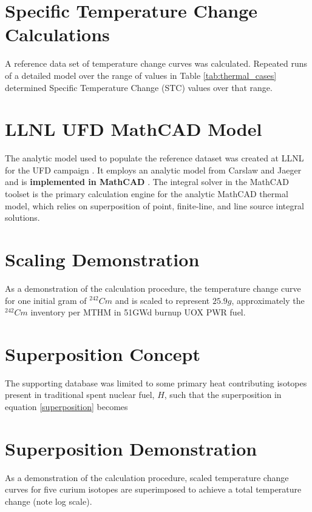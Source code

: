 \documentclass[letterpaper]{article}
\begin{document}
\section{Specific Temperature Change Calculations}
\footnotesize{A reference data set of temperature change curves was calculated. 
Repeated runs of a detailed model over the range of values in Table 
\ref{tab:thermal_cases} determined Specific Temperature Change (STC) values 
over that range.

\section{LLNL UFD MathCAD Model}
The analytic model used to populate the reference dataset was created at 
LLNL for the UFD campaign \cite{hardin_generic_2011, 
greenberg_investigations_2012, greenberg_application_2012}. It employs an 
analytic model from Carslaw and Jaeger and is \textbf{implemented in MathCAD}
\cite{carslaw_conduction_1959, ptc_mathcad_2010}.  The integral solver in the 
MathCAD toolset is the primary calculation engine for the analytic MathCAD 
thermal model, which relies on superposition of point, finite-line, and line 
source integral solutions.  


\section{Scaling Demonstration}
As a demonstration of the calculation procedure, the temperature change 
  curve for one initial gram of $^{242}Cm$ and is scaled to represent $25.9g$, 
  approximately the $^{242}Cm$ inventory per MTHM in 51GWd burnup UOX PWR fuel.

\section{Superposition Concept}

The supporting database was limited to some primary heat contributing isotopes 
present in traditional spent nuclear fuel, $H$, 
such that the superposition in equation \eqref{superposition} becomes 


\section{Superposition Demonstration}
As a demonstration of the calculation procedure, scaled temperature change 
  curves for five curium isotopes are superimposed to achieve a total temperature 
change (note log scale).


}
\end{document}
